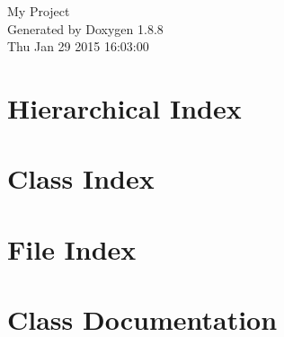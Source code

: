 \documentclass[twoside]{book}
\newcommand{\+}{\discretionary{\mbox{\scriptsize$\hookleftarrow$}}{}{}}
\newcommand{\clearemptydoublepage}{%
  \newpage{\pagestyle{empty}\cleardoublepage}%
}
\begin{document}
\hypersetup{pageanchor=false,
             bookmarks=true,
             bookmarksnumbered=true,
             pdfencoding=unicode
            }
\begin{titlepage}
\vspace*{7cm}
\begin{center}%
{\Large My Project }\\
\vspace*{1cm}
{\large Generated by Doxygen 1.8.8}\\
\vspace*{0.5cm}
{\small Thu Jan 29 2015 16:03:00}\\
\end{center}
\end{titlepage}
\clearemptydoublepage
\tableofcontents
\clearemptydoublepage
{}
\hypersetup{pageanchor=true}

\chapter{Hierarchical Index}

\chapter{Class Index}

\chapter{File Index}

\chapter{Class Documentation}




































\end{document}
